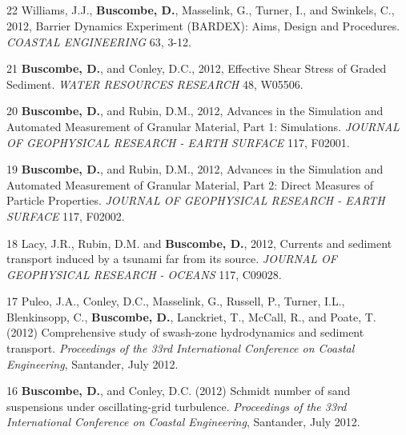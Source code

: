\documentclass[margin,line]{resume}
\begin{document}
\begin{resume}
\begin{footnotesize}
\begin{list1}
	\end{list1}

	\subsection{}
	\begin{list1}
	\item[22] Williams, J.J., {\bf Buscombe, D.}, Masselink, G., Turner, I., and Swinkels, C., 2012, Barrier Dynamics Experiment (BARDEX): Aims, Design and Procedures. {\sl COASTAL ENGINEERING} 63, 3-12.\\

	\item[21] {\bf Buscombe, D.}, and Conley, D.C., 2012, Effective Shear Stress of Graded Sediment. {\sl WATER RESOURCES RESEARCH} 48, W05506.\\

	\item[20] {\bf Buscombe, D.}, and Rubin, D.M., 2012, Advances in the Simulation and Automated Measurement of Granular Material, Part 1: Simulations. {\sl JOURNAL OF GEOPHYSICAL RESEARCH - EARTH SURFACE} 117, F02001.\\

	\item[19] {\bf Buscombe, D.}, and Rubin, D.M., 2012, Advances in the Simulation and Automated Measurement of Granular Material, Part 2: Direct Measures of Particle Properties. {\sl JOURNAL OF GEOPHYSICAL RESEARCH - EARTH SURFACE} 117, F02002.\\

	\item[18] Lacy, J.R., Rubin, D.M. and {\bf Buscombe, D.}, 2012, Currents and sediment transport induced by a tsunami far from its source. {\sl JOURNAL OF GEOPHYSICAL RESEARCH - OCEANS} 117, C09028.\\

	\item[17] Puleo, J.A., Conley, D.C., Masselink, G., Russell, P., Turner, I.L., Blenkinsopp, C., {\bf Buscombe, D.}, Lanckriet, T., McCall, R., and Poate, T. (2012) Comprehensive study of swash-zone hydrodynamics and sediment transport. {\sl Proceedings of the 33rd International Conference on Coastal Engineering}, Santander, July 2012.\\

	\item[16] {\bf Buscombe, D.}, and Conley, D.C. (2012) Schmidt number of sand suspensions under oscillating-grid turbulence. {\sl Proceedings of the 33rd International Conference on Coastal Engineering}, Santander, July 2012.\\


\end{list1}
\end{footnotesize}
\end{resume}
\end{document}
